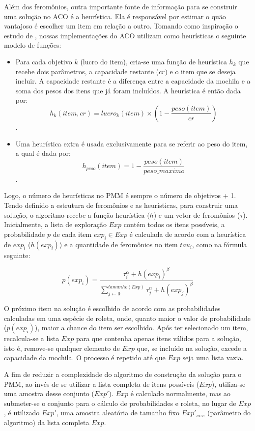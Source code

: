 Além dos feromônios, outra importante fonte de informação para se construir uma solução no ACO é a heurística. Ela é responsável por estimar o quão vantajoso é escolher um item em relação a outro. Tomando como inspiração o estudo de \cite{Ke2010}, nossas implementações do ACO utilizam como heurísticas o seguinte modelo de funções:

\begin{itemize}
	\item Para cada objetivo $k$ (lucro do item), cria-se uma função de heurística $h_k$ que recebe dois parâmetros, a capacidade restante ($cr$) e o item que se deseja incluir. A capacidade restante é a diferença entre a capacidade da mochila e a soma dos pesos dos itens que já foram incluídos. A heurística é então dada por: \[h_k(item, cr) = lucro_k(item) \times (1 - \frac{peso(item)}{cr})\].
	\item Uma heurística extra é usada exclusivamente para se referir ao peso do item, a qual é dada por: \[h_{peso}(item) = 1 - \frac{peso(item)}{peso\_maximo}\].
\end{itemize}

Logo, o número de heurísticas no PMM é sempre o número de objetivos + 1. Tendo definido a estrutura de feromônios e as heurísticas, para construir uma solução, o algoritmo recebe a função heurística ($h$) e um vetor de feromônios ($\tau$). Inicialmente, a lista de exploração $Exp$ contém todos os itens possíveis, a probabilidade $p$ de cada item $exp_i \in Exp$ é calculada de acordo com a heurística de $exp_i$ ($h(exp_i)$) e a quantidade de feromônios no item $tau_i$, como na fórmula seguinte:

\[p(exp_i) = \frac{\tau_i^\alpha + h(exp_i)^\beta}{\sum_{j \gets 0}^{tamanho(Exp)} \tau_j^\alpha + h(exp_j)^\beta}\]

O próximo item na solução é escolhido de acordo com as probabilidades calculadas em uma espécie de roleta, onde, quanto maior o valor de probabilidade ($p(exp_i)$), maior a chance do item ser escolhido. Após ter selecionado um item, recalcula-se a lista $Exp$ para que contenha apenas itens válidos para a solução, isto é, remove-se qualquer elemento de $Exp$ que, se incluído na solução, excede a capacidade da mochila. O processo é repetido até que $Exp$ seja uma lista vazia.

A fim de reduzir a complexidade do algoritmo de construção da solução para o PMM, ao invés de se utilizar a lista completa de itens possíveis ($Exp$), utiliza-se uma amostra desse conjunto ($Exp'$). $Exp$ é calculado normalmente, mas ao submeter-se o conjunto para o cálculo de probabilidades e roleta, no lugar de $Exp$, é utilizado $Exp'$, uma amostra aleatória de tamanho fixo $Exp'_{size}$ (parâmetro do algoritmo) da lista completa $Exp$.
